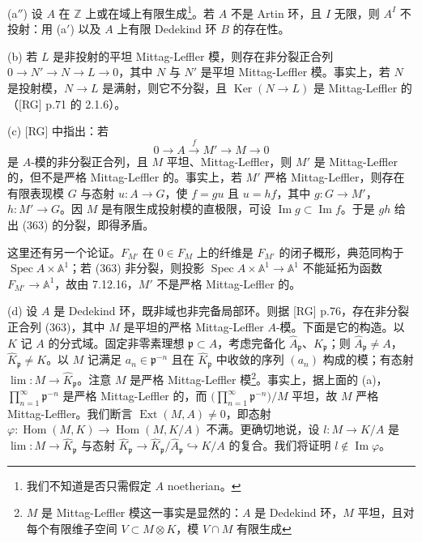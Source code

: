 
(a$''$) 设 $A$ 在 $\mathbb{Z}$ 上或在域上有限生成\footnote{我们不知道是否只需假定 $A$ noetherian。}。若 $A$ 不是 Artin 环，且 $I$ 无限，则 $A^I$ 不投射：用 (a$'$) 以及 $A$ 上有限 Dedekind 环 $B$ 的存在性。

(b) 若 $L$ 是非投射的平坦 Mittag-Leffler 模，则存在非分裂正合列 $0\to N'\to N\to L\to 0$，其中 $N$ 与 $N'$ 是平坦 Mittag-Leffler 模。事实上，若 $N$ 是投射模，$N\to L$ 是满射，则它不分裂，且 $\operatorname{Ker}(N\to L)$ 是 Mittag-Leffler 的（[RG] p.71 的 2.1.6）。

(c) [RG] 中指出：若
\begin{equation}\tag{363}
0\to A\xrightarrow{f}M'\to M\to 0
\end{equation}
是 $A$-模的非分裂正合列，且 $M$ 平坦、Mittag-Leffler，则 $M'$ 是 Mittag-Leffler 的，但不是严格 Mittag-Leffler 的。事实上，若 $M'$ 严格 Mittag-Leffler，则存在有限表现模 $G$ 与态射 $u:A\to G$，使 $f=gu$ 且 $u=hf$，其中 $g:G\to M'$，$h:M'\to G$。因 $M$ 是有限生成投射模的直极限，可设 $\operatorname{Im}g\subset\operatorname{Im}f$。于是 $gh$ 给出 (363) 的分裂，即得矛盾。

这里还有另一个论证。$F_{M'}$ 在 $0\in F_M$ 上的纤维是 $F_{M'}$ 的闭子概形，典范同构于 $\operatorname{Spec}A\times\mathbb{A}^1$；若 (363) 非分裂，则投影 $\operatorname{Spec}A\times\mathbb{A}^1\to\mathbb{A}^1$ 不能延拓为函数 $F_{M'}\to\mathbb{A}^1$，故由 7.12.16，$M'$ 不是严格 Mittag-Leffler 的。


(d) 设 $A$ 是 Dedekind 环，既非域也非完备局部环。则据 [RG] p.76，存在非分裂正合列 (363)，其中 $M$ 是平坦的严格 Mittag-Leffler $A$-模。下面是它的构造。以 $K$ 记 $A$ 的分式域。固定非零素理想 $\mathfrak{p}\subset A$，考虑完备化 $\widehat A_{\mathfrak{p}}$、$\widehat K_{\mathfrak{p}}$；则 $\widehat A_{\mathfrak{p}}\ne A$，$\widehat K_{\mathfrak{p}}\ne K$。以 $M$ 记满足 $a_n\in\mathfrak{p}^{-n}$ 且在 $\widehat K_{\mathfrak{p}}$ 中收敛的序列 $(a_n)$ 构成的模；有态射 $\lim:M\to\widehat K_{\mathfrak{p}}$。注意 $M$ 是严格 Mittag-Leffler 模\footnote{$M$ 是 Mittag-Leffler 模这一事实是显然的：$A$ 是 Dedekind 环，$M$ 平坦，且对每个有限维子空间 $V\subset M\otimes K$，模 $V\cap M$ 有限生成}。事实上，据上面的 (a)，$\prod_{n=1}^{\infty}\mathfrak{p}^{-n}$ 是严格 Mittag-Leffler 的，而 $\bigl(\prod_{n=1}^{\infty}\mathfrak{p}^{-n}\bigr)/M$ 平坦，故 $M$ 严格 Mittag-Leffler。我们断言 $\operatorname{Ext}(M,A)\ne 0$，即态射 $\varphi:\operatorname{Hom}(M,K)\to\operatorname{Hom}(M,K/A)$ 不满。更确切地说，设 $l:M\to K/A$ 是 $\lim:M\to\widehat K_{\mathfrak{p}}$ 与态射 $\widehat K_{\mathfrak{p}}\to\widehat K_{\mathfrak{p}}/\widehat A_{\mathfrak{p}}\hookrightarrow K/A$ 的复合。我们将证明 $l\notin\operatorname{Im}\varphi$。

